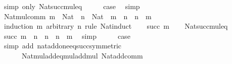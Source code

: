 \begin{isabellebody}
\ {\isacharparenleft}{\kern0pt}simp\ only{\isacharcolon}{\kern0pt}\ Nat{\isacharunderscore}{\kern0pt}succ{\isacharunderscore}{\kern0pt}mul{\isacharunderscore}{\kern0pt}eq{\isacharparenright}{\kern0pt}\isanewline
\ \ \isamarkupfalse%
\ \isamarkupfalse%
\ {\isacharquery}{\kern0pt}case\ \isacommand{{\isachardot}{\kern0pt}}\isamarkupfalse%
\isanewline
{}\isamarkupfalse%
\ simp%
\endisatagproof
{\isafoldproof}%
%
\isadelimproof
\isanewline
%
\endisadelimproof
\isanewline
{}\isamarkupfalse%
\ Nat{\isacharunderscore}{\kern0pt}mul{\isacharunderscore}{\kern0pt}comm{\isacharcolon}{\kern0pt}\ {\isachardoublequoteopen}m\ {\isacharcolon}{\kern0pt}\ Nat\ {\isasymLongrightarrow}\ n\ {\isacharcolon}{\kern0pt}\ Nat\ {\isasymLongrightarrow}\ m\ {\isacharasterisk}{\kern0pt}\ n\ {\isacharequal}{\kern0pt}\ n\ {\isacharasterisk}{\kern0pt}\ m{\isachardoublequoteclose}\isanewline
%
\isadelimproof
%
\endisadelimproof
%
\isatagproof
{}\isamarkupfalse%
\ {\isacharparenleft}{\kern0pt}induction\ m\ arbitrary{\isacharcolon}{\kern0pt}\ n\ rule{\isacharcolon}{\kern0pt}\ Nat{\isacharunderscore}{\kern0pt}induct{\isacharparenright}{\kern0pt}\isanewline
\ \ \isamarkupfalse%
\ {\isacharparenleft}{\kern0pt}succ\ m{\isacharparenright}{\kern0pt}\isanewline
\ \ \isamarkupfalse%
\ Nat{\isacharunderscore}{\kern0pt}succ{\isacharunderscore}{\kern0pt}mul{\isacharunderscore}{\kern0pt}eq\ \isamarkupfalse%
\ {\isachardoublequoteopen}succ\ m\ {\isacharasterisk}{\kern0pt}\ n\ {\isacharequal}{\kern0pt}\ n\ {\isacharplus}{\kern0pt}\ {\isacharparenleft}{\kern0pt}n\ {\isacharasterisk}{\kern0pt}\ m{\isacharparenright}{\kern0pt}{\isachardoublequoteclose}\ \isamarkupfalse%
\ simp\isanewline
\ \ \isamarkupfalse%
\ \isamarkupfalse%
\ {\isacharquery}{\kern0pt}case\isanewline
\ \ \ \ \isamarkupfalse%
\ {\isacharparenleft}{\kern0pt}simp\ add{\isacharcolon}{\kern0pt}\ nat{\isacharunderscore}{\kern0pt}add{\isacharunderscore}{\kern0pt}one{\isacharunderscore}{\kern0pt}eq{\isacharunderscore}{\kern0pt}succ{\isacharbrackleft}{\kern0pt}symmetric{\isacharbrackright}{\kern0pt}\isanewline
\ \ \ \ \ \ Nat{\isacharunderscore}{\kern0pt}mul{\isacharunderscore}{\kern0pt}add{\isacharunderscore}{\kern0pt}eq{\isacharunderscore}{\kern0pt}mul{\isacharunderscore}{\kern0pt}add{\isacharunderscore}{\kern0pt}mul\ Nat{\isacharunderscore}{\kern0pt}add{\isacharunderscore}{\kern0pt}comm{\isacharparenright}{\kern0pt}\isanewline
{}\isamarkupfalse%

\end{isabellebody}
